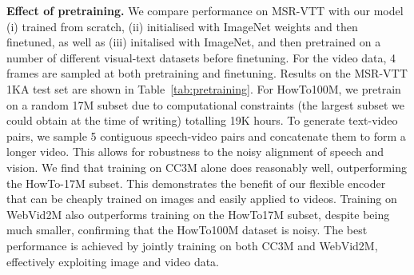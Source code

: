 \noindent\textbf{Effect of pretraining.}
We compare performance on MSR-VTT with our model (i) trained from scratch, (ii) initialised with ImageNet weights and then 
finetuned, as well as (iii) initalised with ImageNet, and then pretrained on a number of different visual-text datasets before 
finetuning. For the video data, 4 frames are sampled at both pretraining and finetuning. Results on the MSR-VTT 1KA test set are shown in  Table~\ref{tab:pretraining}.
For HowTo100M, we pretrain on a random 17M subset due to computational constraints (the largest subset we could obtain at the time of writing) totalling 19K hours. To generate text-video pairs, we sample 5 contiguous speech-video pairs and concatenate them to form a longer video. This allows for robustness to the noisy alignment of speech and vision. We find that training on CC3M alone does reasonably well, outperforming the HowTo-17M subset. This demonstrates the benefit of our flexible encoder that can be cheaply trained on images and easily applied to videos. Training on WebVid2M also outperforms training on the HowTo17M subset, despite being much smaller, confirming that the HowTo100M dataset is noisy. The best performance is achieved by jointly training on both CC3M and WebVid2M, effectively exploiting image and video data. 

